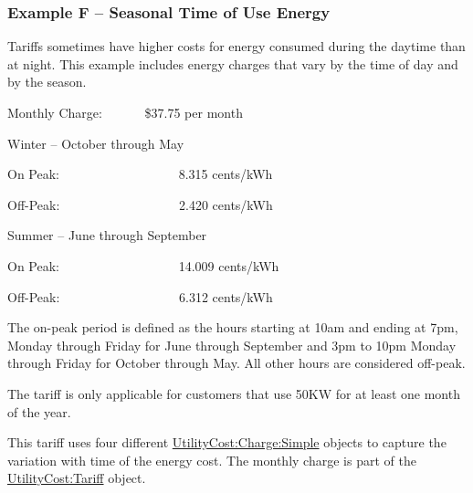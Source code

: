 \subsubsection{Example F -- Seasonal Time of Use Energy}\label{example-f-seasonal-time-of-use-energy}

Tariffs sometimes have higher costs for energy consumed during the daytime than at night. This example includes energy charges that vary by the time of day and by the season.

Monthly Charge:~~~~~~ \$37.75 per month

Winter -- October through May

On Peak:~~~~~~~~~~~~~~~~~~ 8.315 cents/kWh

Off-Peak:~~~~~~~~~~~~~~~~~~ 2.420 cents/kWh

Summer -- June through September

On Peak:~~~~~~~~~~~~~~~~~~ 14.009 cents/kWh

Off-Peak:~~~~~~~~~~~~~~~~~~ 6.312 cents/kWh

The on-peak period is defined as the hours starting at 10am and ending at 7pm, Monday through Friday for June through September and 3pm to 10pm Monday through Friday for October through May. All other hours are considered off-peak.

The tariff is only applicable for customers that use 50KW for at least one month of the year.

This tariff uses four different \hyperref[utilitycostchargesimple]{UtilityCost:Charge:Simple} objects to capture the variation with time of the energy cost. The monthly charge is part of the \hyperref[utilitycosttariff]{UtilityCost:Tariff} object.


